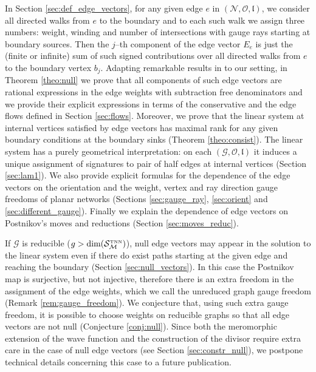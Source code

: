 \documentclass[11pt]{amsart}
\theoremstyle{plain}
\numberwithin{equation}{section}
\def \S {{\mathcal S}_{\mathcal M}^{\mbox{\tiny TNN}}}
\begin{document}
In Section \ref{sec:def_edge_vectors}, for any given edge $e$ in $(\mathcal N,\mathcal O,\mathfrak l)$, we consider all directed walks from $e$ to the boundary and to each such walk we assign three numbers: weight, winding and number of intersections with gauge rays starting at boundary sources. Then the $j$--th component of the edge vector $E_e$ is just the (finite or infinite) sum of such signed contributions over all directed walks from $e$ to the boundary vertex $b_j$. Adapting remarkable results in \cite{Pos,Tal2} to our setting, in Theorem \ref{theo:null} we prove that all components of such edge vectors are rational expressions in the edge weights with subtraction free denominators and we provide their explicit expressions in terms of the conservative and the edge flows defined in Section \ref{sec:flows}. Moreover, we prove that the linear system at internal vertices satisfied by edge vectors has maximal rank for any given boundary conditions at the boundary sinks (Theorem \ref{theo:consist}). The linear system has a purely geometrical interpretation: on each $(\mathcal G,\mathcal O,\mathfrak l)$ it induces a unique assignment of signatures to pair of half edges at internal vertices (Section \ref{sec:lam1}). We also provide explicit formulas for the dependence of the edge vectors on the orientation and the weight, vertex and ray direction gauge freedoms of planar networks (Sections \ref{sec:gauge_ray}, \ref{sec:orient} and \ref{sec:different_gauge}). Finally we explain the dependence of edge vectors on Postnikov's moves and reductions (Section \ref{sec:moves_reduc}). 

If $\mathcal G$ is reducible ($g>\mbox{dim} (\S)$), null edge vectors may appear in the solution to the linear system even if there do exist paths starting at the given edge and reaching the boundary (Section \ref{sec:null_vectors}). In this case the Postnikov map is surjective, but not injective, therefore there is an extra freedom in the assignment of the edge weights, which we call the unreduced graph gauge freedom (Remark \ref{rem:gauge_freedom}). We conjecture that, using such extra gauge freedom, it is possible to choose weights on reducible graphs so that all edge vectors are not null (Conjecture \ref{conj:null}). 
Since both the meromorphic extension of the wave function and the construction of the divisor require extra care in the case of null edge vectors (see Section \ref{sec:constr_null}), we postpone technical details concerning this case to a future publication.  

\smallskip  
\end{document}
